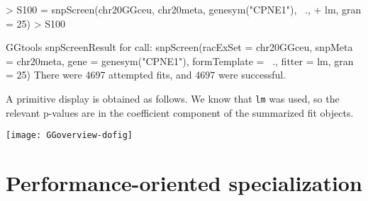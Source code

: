 \documentclass[12pt]{article}
\newcommand{\Rfunction}[1]{{\texttt{#1}}}
\begin{document}
\begin{Schunk}
\begin{Sinput}
> S100 = snpScreen(chr20GGceu, chr20meta, genesym("CPNE1"), ~., 
+     lm, gran = 25)
> S100
\end{Sinput}
\begin{Soutput}
GGtools snpScreenResult for call:
snpScreen(racExSet = chr20GGceu, snpMeta = chr20meta, gene = genesym("CPNE1"), 
    formTemplate = ~., fitter = lm, gran = 25)
There were 4697 attempted fits,
and 4697 were successful.
\end{Soutput}
\end{Schunk}
A primitive display is obtained as follows.  We know that \texttt{lm}
was used, so the relevant p-values are in the coefficient component
of the summarized fit objects.
\begin{Schunk}
\end{Schunk}
\texttt{[image: GGoverview-dofig]}



\section{Performance-oriented specialization}
\end{document}
